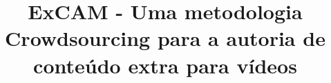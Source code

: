 \documentclass{sig-alternate}
\begin{document}



%

\title{ExCAM - Uma metodologia Crowdsourcing para a autoria de conteúdo extra para vídeos}
%
%
%
%
%
\end{document}
